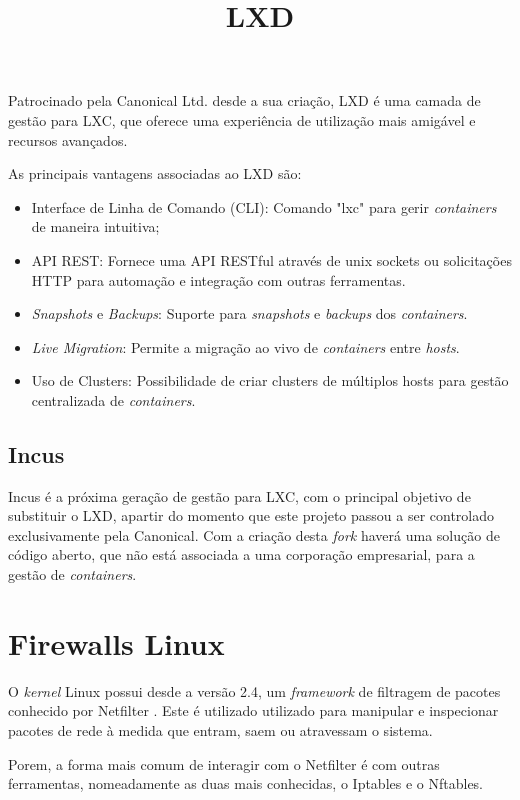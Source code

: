\title*{\textbf{LXD}}

Patrocinado pela Canonical Ltd. desde a sua  criação, LXD é uma camada de gestão para LXC, 
que oferece uma experiência de utilização mais amigável e recursos avançados.

As principais vantagens associadas ao LXD são:
\begin{itemize}
\item Interface de Linha de Comando (CLI): Comando "lxc" para gerir \textit{containers}
de maneira intuitiva;
\item API REST: Fornece uma API RESTful através de unix sockets ou solicitações HTTP para automação e integração com outras ferramentas.
\item \textit{Snapshots} e \textit{Backups}: Suporte para \textit{snapshots} e \textit{backups} dos \textit{containers}.
\item \textit{Live Migration}: Permite a migração ao vivo de \textit{containers} entre \textit{hosts}.
\item Uso de {Clusters}: Possibilidade de criar clusters de múltiplos hosts para gestão centralizada de \textit{containers}.
\end{itemize}


\subsection{Incus}

Incus é a próxima geração de gestão para LXC, com o principal objetivo de substituir o 
LXD, apartir do momento que este projeto passou a ser controlado exclusivamente 
pela Canonical. Com a criação desta \textit{fork} haverá uma solução de código aberto, que 
não está associada a uma corporação empresarial, para a gestão de \textit{containers}.





\section{Firewalls Linux}

O \textit{kernel} Linux possui desde a versão 2.4, um \textit{framework} de filtragem de pacotes 
conhecido por Netfilter \cite{netfilter}. Este é utilizado utilizado para manipular e inspecionar 
pacotes de rede à medida que entram, saem ou atravessam o sistema.

Porem, a forma mais comum de interagir com o Netfilter é com outras ferramentas,
nomeadamente as duas mais conhecidas, o Iptables e o Nftables.

